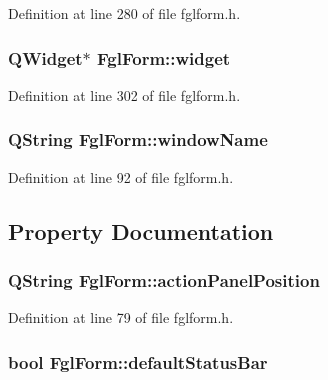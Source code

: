 Definition at line 280 of file fglform.h.

\hypertarget{classFglForm_a15cd139d56b40da6de43a6bb4d438c0d}{
\subsubsection[{widget}]{\setlength{\rightskip}{0pt plus 5cm}QWidget$\ast$ {\bf FglForm::widget}}}
\label{classFglForm_a15cd139d56b40da6de43a6bb4d438c0d}


Definition at line 302 of file fglform.h.

\hypertarget{classFglForm_a154084978ed81b8739db7197541881f5}{
\subsubsection[{windowName}]{\setlength{\rightskip}{0pt plus 5cm}QString {\bf FglForm::windowName}}}
\label{classFglForm_a154084978ed81b8739db7197541881f5}


Definition at line 92 of file fglform.h.



\subsection{Property Documentation}
\hypertarget{classFglForm_a8ca117823135914a8977974b455372a1}{
\subsubsection[{actionPanelPosition}]{\setlength{\rightskip}{0pt plus 5cm}QString FglForm::actionPanelPosition}}
\label{classFglForm_a8ca117823135914a8977974b455372a1}


Definition at line 79 of file fglform.h.

\hypertarget{classFglForm_aed179664fb0f0999affabd3b746edae7}{
\subsubsection[{defaultStatusBar}]{\setlength{\rightskip}{0pt plus 5cm}bool FglForm::defaultStatusBar}}
\label{classFglForm_aed179664fb0f0999affabd3b746edae7}


